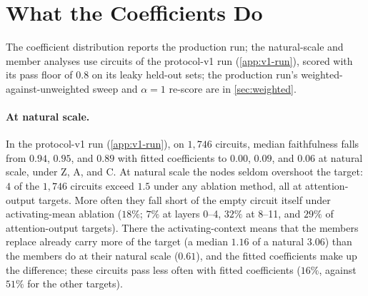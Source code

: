 \documentclass[10pt]{article}
\begin{document}
\section{What the Coefficients Do}
\label{app:weighted-details}
The coefficient distribution reports the production run; the natural-scale and member analyses use circuits of the protocol-v1 run (\cref{app:v1-run}), scored with its pass floor of $0.8$ on its leaky held-out sets; the production run's weighted-against-unweighted sweep and $\alpha = 1$ re-score are in \cref{sec:weighted}.

\paragraph{At natural scale.}
In the protocol-v1 run (\cref{app:v1-run}), on $1{,}746$ circuits, median faithfulness falls from $0.94$, $0.95$, and $0.89$ with fitted coefficients to $0.00$, $0.09$, and $0.06$ at natural scale, under Z, A, and C.
At natural scale the nodes seldom overshoot the target: $4$ of the $1{,}746$ circuits exceed $1.5$ under any ablation method, all at attention-output targets.
More often they fall short of the empty circuit itself under activating-mean ablation ($18\%$; $7\%$ at layers 0--4, $32\%$ at 8--11, and $29\%$ of attention-output targets).
There the activating-context means that the members replace already carry more of the target (a median $1.16$ of a natural $3.06$) than the members do at their natural scale ($0.61$), and the fitted coefficients make up the difference; these circuits pass less often with fitted coefficients ($16\%$, against $51\%$ for the other targets).
\end{document}
